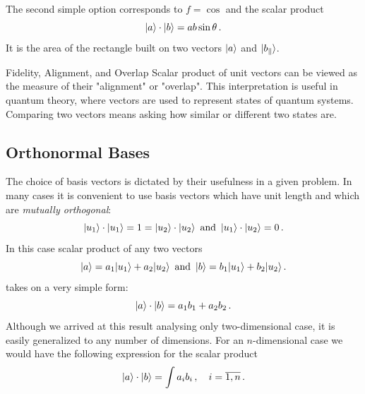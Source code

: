 The second simple option corresponds to $f=\cos$ and the scalar product
\[
|{a}\rangle\cdot|{b}\rangle = ab\sin\theta\,.
\]
It is the area of the rectangle built on two vectors $|{a}\rangle$ and $|{b_\parallel}\rangle$. 

\begin{mybio}{Fidelity, Alignment, and Overlap}
	Scalar product of unit vectors can be viewed as the measure of their "alignment" or "overlap". This interpretation is useful in quantum theory, where vectors are used to represent states of quantum systems. Comparing two vectors means asking how similar or different two states are.
\end{mybio}

\subsection{Orthonormal Bases}
The choice of basis vectors is dictated by their usefulness in a given problem. In many cases it is convenient to use basis vectors which have unit length and which are \emph{mutually orthogonal}:
\[
|{u_1}\rangle\cdot|{u_1}\rangle=1=|{u_2}\rangle\cdot|{u_2}\rangle\,\textrm{ and }\,|{u_1}\rangle\cdot|{u_2}\rangle=0\,.
\]
In this case scalar product of any two vectors 
\[
|{a}\rangle=a_1|{u_1}\rangle+a_2|{u_2}\rangle\,\textrm{ and }\,|{b}\rangle=b_1|{u_1}\rangle+b_2|{u_2}\rangle\,.
\]
takes on a very simple form:
\[
|{a}\rangle\cdot|{b}\rangle=a_1b_1+a_2b_2\,.
\]
Although we arrived at this result analysing only two-dimensional case, it is easily generalized to any number of dimensions. For an $n$-dimensional case we would have the following expression for the scalar product
\[
|{a}\rangle\cdot|{b}\rangle=\int a_ib_i\,,\quad  i=\overline{1,n}\,.
\]


